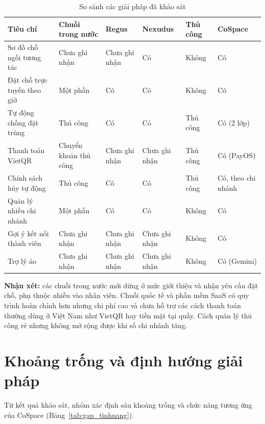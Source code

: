 \begin{table}[!htbp]
\centering
\caption{So sánh các giải pháp đã khảo sát}
\label{tab:sosanh_hethong}
\footnotesize
\renewcommand{\arraystretch}{1.2}
\begin{tabularx}{\linewidth}{|L|P{2.1cm}|P{1.9cm}|P{1.9cm}|P{1.8cm}|P{1.9cm}|}
\hline
\textbf{Tiêu chí} & \textbf{Chuỗi trong nước} & \textbf{Regus} & \textbf{Nexudus} & \textbf{Thủ công} & \textbf{CoSpace} \\
\hline
Sơ đồ chỗ ngồi tương tác & Chưa ghi nhận & Chưa ghi nhận & Có & Không & Có \\
\hline
Đặt chỗ trực tuyến theo giờ & Một phần & Có & Có & Không & Có \\
\hline
Tự động chống đặt trùng & Thủ công & Có & Có & Thủ công & Có (2 lớp) \\
\hline
Thanh toán VietQR & Chuyển khoản thủ công & Chưa ghi nhận & Chưa ghi nhận & Thủ công & Có (PayOS) \\
\hline
Chính sách hủy tự động & Thủ công & Có & Có & Thủ công & Có, theo chi nhánh \\
\hline
Quản lý nhiều chi nhánh & Một phần & Có & Có & Không & Có \\
\hline
Gợi ý kết nối thành viên & Chưa ghi nhận & Chưa ghi nhận & Chưa ghi nhận & Không & Có \\
\hline
Trợ lý ảo & Chưa ghi nhận & Chưa ghi nhận & Chưa ghi nhận & Không & Có (Gemini) \\
\hline
\end{tabularx}
\end{table}

\noindent\textbf{Nhận xét:} các chuỗi trong nước mới dừng ở mức giới thiệu và nhận yêu cầu đặt chỗ, phụ thuộc nhiều vào nhân viên. Chuỗi quốc tế và phần mềm SaaS có quy trình hoàn chỉnh hơn nhưng chi phí cao và chưa hỗ trợ các cách thanh toán thường dùng ở Việt Nam như VietQR hay tiền mặt tại quầy. Cách quản lý thủ công rẻ nhưng không mở rộng được khi số chi nhánh tăng.

\section{Khoảng trống và định hướng giải pháp}
\label{sec:gap}

Từ kết quả khảo sát, nhóm xác định sáu khoảng trống và chức năng tương ứng của CoSpace (Bảng~\ref{tab:gap_tinhnang}).

